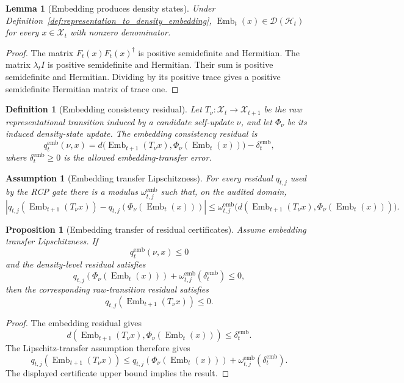 \documentclass[11pt]{article}
\newtheorem{lemma}[theorem]{Lemma}
\newtheorem{proposition}[theorem]{Proposition}
\newtheorem{definition}[theorem]{Definition}
\newtheorem{assumption}[theorem]{Assumption}
\newcommand{\D}{\mathcal{D}}
\newcommand{\Hcal}{\mathcal{H}}
\newcommand{\Xcal}{\mathcal{X}}
\newcommand{\1}{\mathbf{1}}
\providecommand{\Embed}{\operatorname{Emb}}
\begin{document}
\begin{lemma}[Embedding produces density states]
\label{lem:embedding_produces_density_states}
Under Definition~\ref{def:representation_to_density_embedding}, \(\Embed_t(x)\in\D(\Hcal_t)\) for every \(x\in\Xcal_t\) with nonzero denominator.
\end{lemma}

\begin{proof}
The matrix \(F_t(x)F_t(x)^\dagger\) is positive semidefinite and Hermitian.  The matrix \(\lambda_t I\) is positive semidefinite and Hermitian.  Their sum is positive semidefinite and Hermitian.  Dividing by its positive trace gives a positive semidefinite Hermitian matrix of trace one.
\end{proof}

\begin{definition}[Embedding consistency residual]
\label{def:embedding_consistency_residual}
Let \(T_\nu:\Xcal_t\to\Xcal_{t+1}\) be the raw representational transition induced by a candidate self-update \(\nu\), and let \(\Phi_\nu\) be its induced density-state update.  The embedding consistency residual is
\[
q_t^{\mathrm{emb}}(\nu,x)
=
 d\bigl(\Embed_{t+1}(T_\nu x),\Phi_\nu(\Embed_t(x))\bigr)-\delta_t^{\mathrm{emb}},
\]
where \(\delta_t^{\mathrm{emb}}\ge0\) is the allowed embedding-transfer error.
\end{definition}

\begin{assumption}[Embedding transfer Lipschitzness]
\label{ass:embedding_transfer_lipschitzness}
For every residual \(q_{t,j}\) used by the RCP gate there is a modulus \(\omega_{t,j}^{\mathrm{emb}}\) such that, on the audited domain,
\[
|q_{t,j}(\Embed_{t+1}(T_\nu x))-q_{t,j}(\Phi_\nu(\Embed_t(x)))|
\le
\omega_{t,j}^{\mathrm{emb}}\bigl(d(\Embed_{t+1}(T_\nu x),\Phi_\nu(\Embed_t(x)))\bigr).
\]
\end{assumption}

\begin{proposition}[Embedding transfer of residual certificates]
\label{prop:embedding_transfer_residual_certificates}
Assume embedding transfer Lipschitzness.  If
\[
q_t^{\mathrm{emb}}(\nu,x)
\le0
\]
and the density-level residual satisfies
\[
q_{t,j}(\Phi_\nu(\Embed_t(x)))+\omega_{t,j}^{\mathrm{emb}}(\delta_t^{\mathrm{emb}})
\le0,
\]
then the corresponding raw-transition residual satisfies
\[
q_{t,j}(\Embed_{t+1}(T_\nu x))\le0.
\]
\end{proposition}

\begin{proof}
The embedding residual gives
\[
d(\Embed_{t+1}(T_\nu x),\Phi_\nu(\Embed_t(x)))\le\delta_t^{\mathrm{emb}}.
\]
The Lipschitz-transfer assumption therefore gives
\[
q_{t,j}(\Embed_{t+1}(T_\nu x))
\le
q_{t,j}(\Phi_\nu(\Embed_t(x)))+
\omega_{t,j}^{\mathrm{emb}}(\delta_t^{\mathrm{emb}}).
\]
The displayed certificate upper bound implies the result.
\end{proof}
\end{document}
